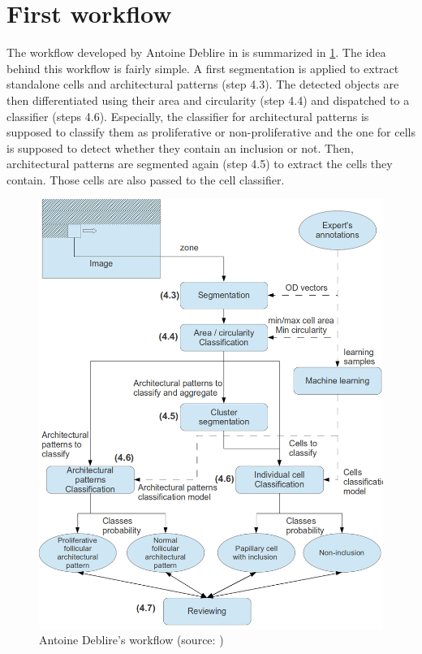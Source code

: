 \section{First workflow}
\label{sec:thyroid_adeblire_algo}

The workflow developed by Antoine Deblire in \cite{adeblire2013} is summarized in \ref{fig:workflow_adeblire}. The idea behind this workflow is fairly simple. A first segmentation is applied to extract standalone cells and architectural patterns (step 4.3). The detected objects are then differentiated using their area and circularity (step 4.4) and dispatched to a classifier (steps 4.6). Especially, the classifier for architectural patterns is supposed to classify them as proliferative or non-proliferative and the one for cells is supposed to detect whether they contain an inclusion or not. Then, architectural patterns are segmented again (step 4.5) to extract the cells they contain. Those cells are also passed to the cell classifier. 

\begin{figure}
	\center
	\includegraphics[scale=0.95]{image/adeblire_workflow.png}
	\caption{Antoine Deblire's workflow (source: \cite{adeblire2013})}
	\label{fig:workflow_adeblire}
\end{figure}

